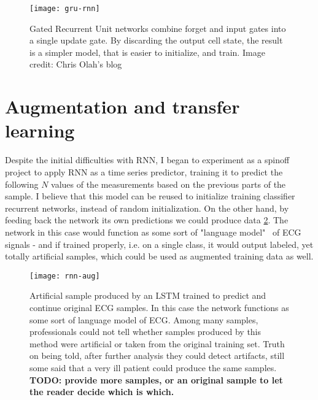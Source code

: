 \begin{figure}
  \centering
  \texttt{[image: gru-rnn]}
  \caption{Gated Recurrent Unit networks combine forget and input gates into a single update gate. By discarding the output cell state, the result is a simpler model, that is easier to initialize, and train. Image credit: Chris Olah's blog~\cite{chris_olah_understanding_nodate}}
  \label{fig:gru}
\end{figure}

\section{Augmentation and transfer learning}
Despite the initial difficulties with RNN, I began to experiment as a spinoff project to apply RNN as a time series predictor, training it to predict the following $N$ values of the measurements based on the previous parts of the sample. I believe that this model can be reused to initialize training classifier recurrent networks, instead of random initialization.
On the other hand, by feeding back the network its own predictions we could produce data \ref{fig:rnn-aug}. The network in this case would function as some sort of "language model"~\cite{lang-model} of ECG signals - and if trained properly, i.e. on a single class, it would output labeled, yet totally artificial samples, which could be used as augmented training data as well.

\begin{figure}
  \centering
  \texttt{[image: rnn-aug]}
  \caption{Artificial sample produced by an LSTM trained to predict and continue original ECG samples. In this case the network functions as some sort of language model of ECG. Among many samples, professionals could not tell whether samples produced by this method were artificial or taken from the original training set. Truth on being told, after further analysis they could detect artifacts, still some said that a very ill patient could produce the same samples. \textbf{TODO: provide more samples, or an original sample to let the reader decide which is which.}}
  \label{fig:rnn-aug}
\end{figure}

